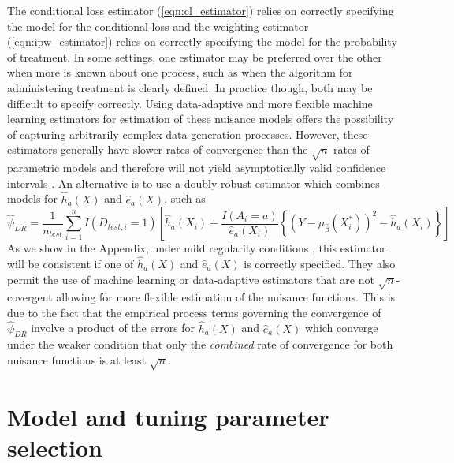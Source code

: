 The conditional loss estimator (\ref{eqn:cl_estimator}) relies on correctly specifying the model for the conditional loss and the weighting estimator (\ref{eqn:ipw_estimator})  relies on correctly specifying the model for the probability of treatment. In some settings, one estimator may be preferred over the other when more is known about one process, such as when the algorithm for administering treatment is clearly defined. In practice though, both may be difficult to specify correctly. Using data-adaptive and more flexible machine learning estimators for estimation of these nuisance models offers the possibility of capturing arbitrarily complex data generation processes. However, these estimators generally have slower rates of convergence than the $\sqrt{n}$ rates of parametric models and therefore will not yield asymptotically valid confidence intervals \cite{chernozhukov_doubledebiased_2018}. An alternative is to use a doubly-robust estimator which combines models for $\widehat{h}_a(X)$ and $\widehat{e}_a(X)$, such as
\begin{equation}
    \widehat{\psi}_{DR} = \frac{1}{n_{test}} \sum_{i=1}^n I(D_{test,i} = 1) \left[ \widehat{h}_a(X_i) + \frac{I(A_i = a)}{\widehat{e}_a(X_i)} \left\{ (Y - \mu_{\widehat{\beta}}(X^*_i))^2 - \widehat{h}_a(X_i)\right\}\right]
\end{equation}
As we show in the Appendix, under mild regularity conditions \cite{robins_higher_2008}, this estimator will be consistent if one of $\widehat{h}_a(X)$ and $\widehat{e}_a(X)$ is correctly specified. They also permit the use of machine learning or data-adaptive estimators that are not $\sqrt{n}$-covergent allowing for more flexible estimation of the nuisance functions. This is due to the fact that the empirical process terms governing the convergence of $\widehat{\psi}_{DR}$ involve a product of the errors for $\widehat{h}_a(X)$ and $\widehat{e}_a(X)$ which converge under the weaker condition that only the \textit{combined} rate of convergence for both nuisance functions is at least $\sqrt{n}$.

\section{Model and tuning parameter selection} \label{sec:selection}


